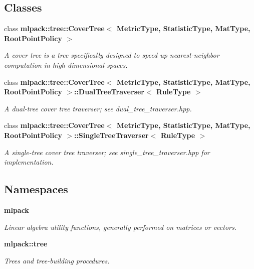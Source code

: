 \subsection*{Classes}
\begin{DoxyCompactItemize}
\item 
class {\bf mlpack\+::tree\+::\+Cover\+Tree$<$ Metric\+Type, Statistic\+Type, Mat\+Type, Root\+Point\+Policy $>$}
\begin{DoxyCompactList}\small\item\em A cover tree is a tree specifically designed to speed up nearest-\/neighbor computation in high-\/dimensional spaces. \end{DoxyCompactList}\item 
class {\bf mlpack\+::tree\+::\+Cover\+Tree$<$ Metric\+Type, Statistic\+Type, Mat\+Type, Root\+Point\+Policy $>$\+::\+Dual\+Tree\+Traverser$<$ Rule\+Type $>$}
\begin{DoxyCompactList}\small\item\em A dual-\/tree cover tree traverser; see dual\+\_\+tree\+\_\+traverser.\+hpp. \end{DoxyCompactList}\item 
class {\bf mlpack\+::tree\+::\+Cover\+Tree$<$ Metric\+Type, Statistic\+Type, Mat\+Type, Root\+Point\+Policy $>$\+::\+Single\+Tree\+Traverser$<$ Rule\+Type $>$}
\begin{DoxyCompactList}\small\item\em A single-\/tree cover tree traverser; see single\+\_\+tree\+\_\+traverser.\+hpp for implementation. \end{DoxyCompactList}\end{DoxyCompactItemize}
\subsection*{Namespaces}
\begin{DoxyCompactItemize}
\item 
 {\bf mlpack}
\begin{DoxyCompactList}\small\item\em Linear algebra utility functions, generally performed on matrices or vectors. \end{DoxyCompactList}\item 
 {\bf mlpack\+::tree}
\begin{DoxyCompactList}\small\item\em Trees and tree-\/building procedures. \end{DoxyCompactList}\end{DoxyCompactItemize}
